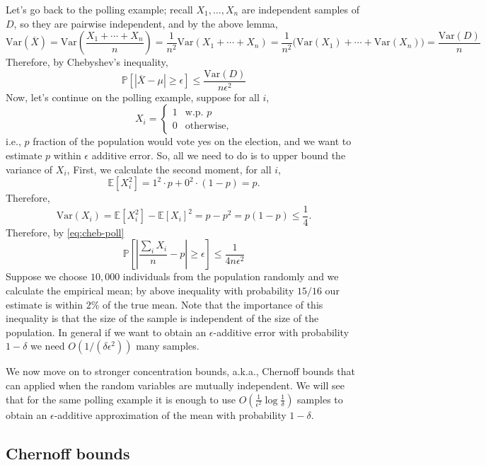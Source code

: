 Let's go back to the polling example; recall $X_1,\ldots,X_n$ are independent samples of $D$, so they are pairwise independent, and by the above lemma,
\[
  \mathrm{Var}(\overline{X}) = \mathrm{Var}\left(\frac{X_1+\cdots+X_n}{n}\right)
  = \frac{1}{n^2}\mathrm{Var}(X_1+\cdots+X_n)
  = \frac{1}{n^2}\big(\mathrm{Var}(X_1)+\cdots+\mathrm{Var}(X_n)\big)
  = \frac{\mathrm{Var}(D)}{n}
\]
Therefore, by Chebyshev's inequality,
\begin{equation}\label{eq:cheb-poll}
  \mathbb{P}\left[|\overline{X}-\mu|\ge\epsilon\right] \le \frac{\mathrm{Var}(D)}{n\epsilon^2}
\end{equation}
Now, let's continue on the polling example, suppose for all $i$,
\[
  X_i = \begin{cases} 1 & \text{w.p. } p\\ 0 & \text{otherwise,}\end{cases}
\]
i.e., $p$ fraction of the population would vote yes on the election, and we want to estimate $p$ within $\epsilon$ additive error. So, all we need to do is to upper bound the variance of $X_i$, First, we calculate the second moment, for all $i$,
\[
  \mathbb{E}\left[X_i^2\right] = 1^2\cdot p + 0^2\cdot(1-p) = p.
\]
Therefore,
\[
  \mathrm{Var}(X_i) = \mathbb{E}\left[X_i^2\right] - \mathbb{E}[X_i]^2 = p-p^2 = p(1-p)\le\frac14.
\]
Therefore, by \eqref{eq:cheb-poll}
\[
  \mathbb{P}\left[\left|\frac{\sum_i X_i}{n}-p\right|\ge\epsilon\right] \le \frac{1}{4n\epsilon^2}
\]
Suppose we choose $10{,}000$ individuals from the population randomly and we calculate the empirical mean; by above inequality with probability $15/16$ our estimate is within $2\%$ of the true mean. Note that the importance of this inequality is that the size of the sample is independent of the size of the population. In general if we want to obtain an $\epsilon$-additive error with probability $1-\delta$ we need $O(1/(\delta\epsilon^2))$ many samples.

We now move on to stronger concentration bounds, a.k.a., Chernoff bounds that can applied when the random variables are mutually independent. We will see that for the same polling example it is enough to use $O\!\left(\frac{1}{\epsilon^2}\log\frac1\delta\right)$ samples to obtain an $\epsilon$-additive approximation of the mean with probability $1-\delta$.

\subsection{Chernoff bounds}

